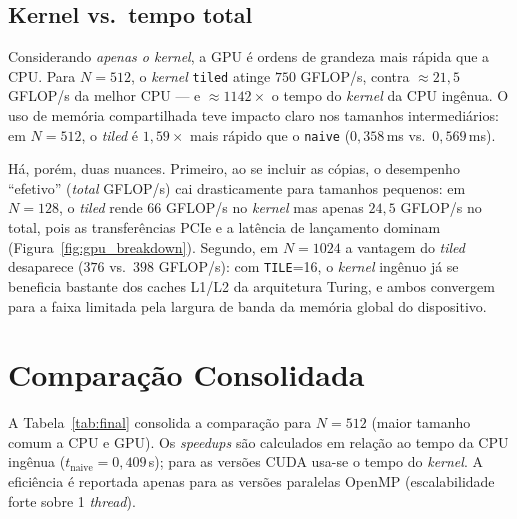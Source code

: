 \documentclass{sbc2023}%
\begin{document}
\subsection{Kernel vs.\ tempo total}

Considerando \emph{apenas o kernel}, a GPU é ordens de grandeza mais rápida que a CPU. Para $N=512$, o \textit{kernel} \texttt{tiled} atinge $750$ GFLOP/s, contra $\approx 21{,}5$ GFLOP/s da melhor CPU --- e $\approx 1142\times$ o tempo do \textit{kernel} da CPU ingênua. O uso de memória compartilhada teve impacto claro nos tamanhos intermediários: em $N=512$, o \textit{tiled} é $1{,}59\times$ mais rápido que o \texttt{naive} ($0{,}358$\,ms vs.\ $0{,}569$\,ms).

Há, porém, duas nuances. Primeiro, ao se incluir as cópias, o desempenho ``efetivo'' (\textit{total} GFLOP/s) cai drasticamente para tamanhos pequenos: em $N=128$, o \textit{tiled} rende $66$ GFLOP/s no \textit{kernel} mas apenas $24{,}5$ GFLOP/s no total, pois as transferências PCIe e a latência de lançamento dominam (Figura~\ref{fig:gpu_breakdown}). Segundo, em $N=1024$ a vantagem do \textit{tiled} desaparece ($376$ vs.\ $398$ GFLOP/s): com \texttt{TILE}=16, o \textit{kernel} ingênuo já se beneficia bastante dos caches L1/L2 da arquitetura Turing, e ambos convergem para a faixa limitada pela largura de banda da memória global do dispositivo.


\section{Comparação Consolidada}
\label{sec:comparacao}

A Tabela~\ref{tab:final} consolida a comparação para $N=512$ (maior tamanho comum a CPU e GPU). Os \textit{speedups} são calculados em relação ao tempo da CPU ingênua ($t_{\text{naive}}=0{,}409$\,s); para as versões CUDA usa-se o tempo do \textit{kernel}. A eficiência é reportada apenas para as versões paralelas OpenMP (escalabilidade forte sobre 1 \textit{thread}).
\end{document}
